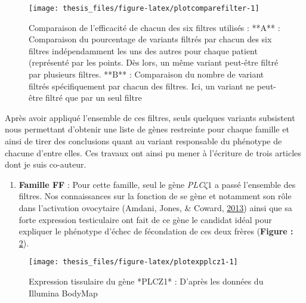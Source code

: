 \documentclass[12pt,twoside]{reedthesis}
\providecommand{\tightlist}{%
  \setlength{\itemsep}{0pt}\setlength{\parskip}{0pt}}
\theoremstyle{definition}
\theoremstyle{definition}
\theoremstyle{remark}
\begin{document}
  \begin{figure}
  
  {\centering \texttt{[image: thesis\_files/figure-latex/plotcomparefilter-1]} 
  
  }
  
  \caption[Comparaison de l'efficacité de chacun des six filtres utilisés]{Comparaison de l'efficacité de chacun des six filtres utilisés : **A** : Comparaison du pourcentage de variants filtrés par chacun des six filtres indépendamment les uns des autres pour chaque patient (représenté par les points. Dès lors, un même variant peut-être filtré par plusieurs filtres. **B** : Comparaison du nombre de variant filtrés spécifiquement par chacun des filtres. Ici, un variant ne peut-être filtré que par un seul filtre}\label{fig:plotcomparefilter}
  \end{figure}
  
  Après avoir appliqué l'ensemble de ces filtres, seuls quelques variants
  subsistent nous permettant d'obtenir une liste de gènes restreinte pour
  chaque famille et ainsi de tirer des conclusions quant au variant
  responsable du phénotype de chacune d'entre elles. Ces travaux ont ainsi
  pu mener à l'écriture de trois articles dont je suis co-auteur.
  
  \newpage
  
  \newpage  
  
  \begin{enumerate}
  \def\labelenumi{\arabic{enumi}.}
  \setcounter{enumi}{1}
  \tightlist
  \item
    \textbf{Famille FF} : Pour cette famille, seul le gène
    \emph{PLC}\(\zeta 1\) a passé l'ensemble des filtres. Nos
    connaissances sur la fonction de se gène et notamment son rôle dans
    l'activation ovocytaire (Amdani, Jones, \& Coward,
    \protect\hyperlink{ref-Amdani2013}{2013}) ainsi que sa forte
    expression testiculaire ont fait de ce gène le candidat idéal pour
    expliquer le phénotype d'échec de fécondation de ces deux frères
    (\textbf{Figure : }\ref{fig:plotexpplcz1}).
  \end{enumerate}
  
  \begin{figure}
  
  {\centering \texttt{[image: thesis\_files/figure-latex/plotexpplcz1-1]} 
  
  }
  
  \caption[Expression tissulaire du gène *PLCZ1*]{Expression tissulaire du gène *PLCZ1* : D'après les données du Illumina BodyMap}\label{fig:plotexpplcz1}
  \end{figure}
  
\end{document}
